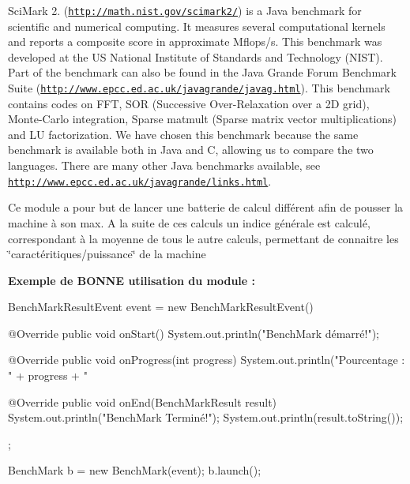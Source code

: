 Sci\-Mark 2. (\href{http://math.nist.gov/scimark2/}{\tt http\-://math.\-nist.\-gov/scimark2/}) is a Java benchmark for scientific and numerical computing. It measures several computational kernels and reports a composite score in approximate Mflops/s. This benchmark was developed at the U\-S National Institute of Standards and Technology (N\-I\-S\-T). Part of the benchmark can also be found in the Java Grande Forum Benchmark Suite (\href{http://www.epcc.ed.ac.uk/javagrande/javag.html}{\tt http\-://www.\-epcc.\-ed.\-ac.\-uk/javagrande/javag.\-html}). This benchmark contains codes on F\-F\-T, S\-O\-R (Successive Over-\/\-Relaxation over a 2\-D grid), Monte-\/\-Carlo integration, Sparse matmult (Sparse matrix vector multiplications) and L\-U factorization. We have chosen this benchmark because the same benchmark is available both in Java and C, allowing us to compare the two languages. There are many other Java benchmarks available, see \href{http://www.epcc.ed.ac.uk/javagrande/links.html}{\tt http\-://www.\-epcc.\-ed.\-ac.\-uk/javagrande/links.\-html}.

Ce module a pour but de lancer une batterie de calcul différent afin de pousser la machine à son max. A la suite de ces calculs un indice générale est calculé, correspondant à la moyenne de tous le autre calculs, permettant de connaitre les \char`\"{}caractéritiques/puissance\char`\"{} de la machine

{\bfseries Exemple de B\-O\-N\-N\-E utilisation du module \-: } \begin{DoxyVerb}  BenchMarkResultEvent event = new BenchMarkResultEvent() {

        @Override
        public void onStart() {
              System.out.println("BenchMark démarré!");
        }

        @Override
        public void onProgress(int progress) {
              System.out.println("Pourcentage : " + progress + "%
        }

        @Override
        public void onEnd(BenchMarkResult result) {
              System.out.println("BenchMark Terminé!");
              System.out.println(result.toString());
        }
  };

  BenchMark b = new BenchMark(event);
  b.launch();\end{DoxyVerb}
 